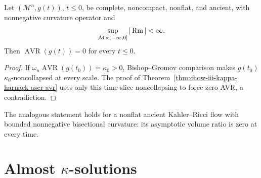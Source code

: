 \begin{corollary}[Any ancient solution with bounded $\Rm\ge0$ must have AVR $=0$]
\label{cor:chow-iii-ancient-bounded-nonnegative-avr-zero}
Let $(\mathcal M^n,g(t))$, $t\le0$, be complete, noncompact, nonflat, and
ancient, with nonnegative curvature operator and
\[
 \sup_{\mathcal M\times(-\infty,0]}|\Rm|<\infty.
\]
Then $\operatorname{AVR}(g(t))=0$ for every $t\le0$.
\end{corollary}
\begin{proof}
If $\omega_n\operatorname{AVR}(g(t_0))=\kappa_0>0$, Bishop--Gromov
comparison makes $g(t_0)$ $\kappa_0$-noncollapsed at every scale.  The proof
of Theorem~\ref{thm:chow-iii-kappa-harnack-ascr-avr} uses only this
time-slice noncollapsing to force zero AVR, a contradiction.
\end{proof}

\begin{remark}
\label{rem:chow-iii-kahler-ancient-avr-zero}
The analogous statement holds for a nonflat ancient Kahler--Ricci flow with
bounded nonnegative bisectional curvature: its asymptotic volume ratio is
zero at every time.
\end{remark}

\section{\texorpdfstring{Almost $\kappa$-solutions}{Almost Kappa-solutions}}

